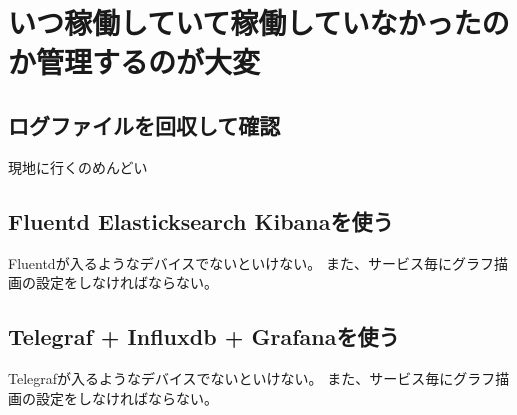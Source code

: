\section{いつ稼働していて稼働していなかったのか管理するのが大変}
\subsection{ログファイルを回収して確認}
現地に行くのめんどい
\subsection{Fluentd Elasticksearch Kibanaを使う}
Fluentdが入るようなデバイスでないといけない。
また、サービス毎にグラフ描画の設定をしなければならない。

\subsection{Telegraf + Influxdb + Grafanaを使う}
Telegrafが入るようなデバイスでないといけない。
また、サービス毎にグラフ描画の設定をしなければならない。



